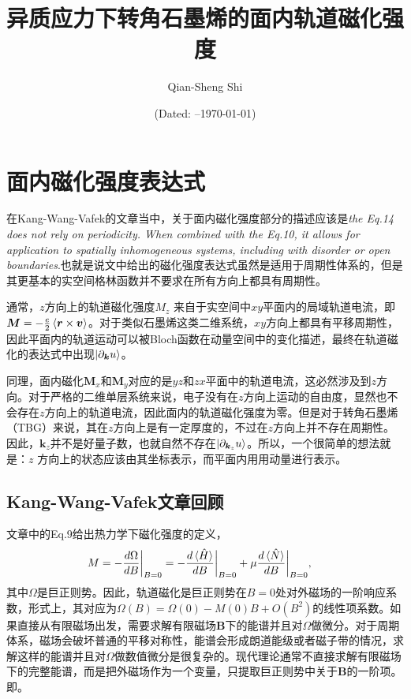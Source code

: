 \documentclass[10pt, oneside]{article}
\title{\fontsize{15pt}{20pt}\selectfont\bfseries
异质应力下转角石墨烯的面内轨道磁化强度}
\author[1]{Qian-Sheng Shi}
\affil[1]{
School of Physical Science and Technology, ShanghaiTech University, \protect\\
Shanghai 201210, China.
}
\date{\fontsize{11pt}{14pt}\selectfont
(Dated: \notestartdate --\today)}
\makeatletter
\renewcommand{\@maketitle}{%
	\begin{center}
		{\@title \par}
		\vspace{1em}
		{\@author \par}
		\vspace{0.15em}
		{\@date \par}
	\end{center}
}
\renewcommand{\maketitle}{%
	\begingroup
		\let\footnote\thanks
		\@maketitle
	\endgroup
}
\newcommand{\pa}{\partial}
\newcommand{\p}[1]{\left(#1\right)}
\makeatother
\begin{document}
{\fontsize{12pt}{16pt}\selectfont
\tableofcontents
}

\vspace{0.8em}

\maketitle

\thispagestyle{plain}

\clearpage

\section{面内磁化强度表达式}

在Kang-Wang-Vafek的文章当中，关于面内磁化强度部分的描述应该是\textit{the Eq.14 does not rely on periodicity. When combined with the Eq.10, it allows for application to spatially inhomogeneous systems, including with disorder or open boundaries}.也就是说文中给出的磁化强度表达式虽然是适用于周期性体系的，但是其更基本的实空间格林函数并不要求在所有方向上都具有周期性。

通常，\(z\)方向上的轨道磁化强度\(M_z\) 来自于实空间中\(xy\)平面内的局域轨道电流，即\(\bm{M} = -\frac{e}{2} \braket{\bm{r} \times \bm{v}}\)。对于类似石墨烯这类二维系统，\(xy\)方向上都具有平移周期性，因此平面内的轨道运动可以被Bloch函数在动量空间中的变化描述，最终在轨道磁化的表达式中出现\(\ket{\pa_{\bm{k}} u}\)。

同理，面内磁化\(\bm{M}_{x}\)和\(\bm{M}_{y}\)对应的是\(yz\)和\(zx\)平面中的轨道电流，这必然涉及到\(z\)方向。对于严格的二维单层系统来说，电子没有在\(z\)方向上运动的自由度，显然也不会存在\(z\)方向上的轨道电流，因此面内的轨道磁化强度为零。但是对于转角石墨烯（TBG）来说，其在\(z\)方向上是有一定厚度的，不过在\(z\)方向上并不存在周期性。因此，\(\bm{k}_z\)并不是好量子数，也就自然不存在\(\ket{\pa_{\bm{k}_z} u}\)。所以，一个很简单的想法就是：\(z\) 方向上的状态应该由其坐标表示，而平面内用用动量进行表示。

\subsection{Kang-Wang-Vafek文章回顾}
文章中的Eq.9给出热力学下磁化强度的定义，
\begin{align}
    M &= - \frac{d \Omega}{d B}\bigg|_{B = 0} = - \frac{d \braket{\hat{H}}}{dB}\bigg|_{B = 0} + \mu \frac{d \braket{\hat{N}}}{dB}\bigg|_{B = 0}, 
\end{align}
其中\(\Omega\)是巨正则势。因此，轨道磁化是巨正则势在\(B = 0\)处对外磁场的一阶响应系数，形式上，其对应为\(\Omega\p{B} = \Omega \p{0} - M \p{0} B + O \p{B^2}\)的线性项系数。如果直接从有限磁场出发，需要求解有限磁场\(\bm{B}\)下的能谱并且对\(\Omega\)做微分。对于周期体系，磁场会破坏普通的平移对称性，能谱会形成朗道能级或者磁子带的情况，求解这样的能谱并且对\(\Omega\)做数值微分是很复杂的。现代理论通常不直接求解有限磁场下的完整能谱，而是把外磁场作为一个变量，只提取巨正则势中关于\(\bm{B}\)的一阶项。即。
\end{document}
